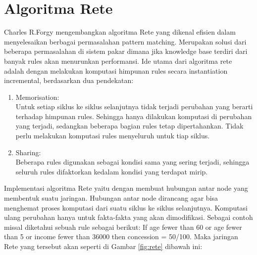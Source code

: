 \section{Algoritma Rete}
Charles R.Forgy \cite{charles1982} mengembangkan algoritma Rete yang dikenal efisien dalam menyelesaikan berbagai permasalahan pattern matching. Merupakan solusi dari beberapa permasalahan di sistem pakar dimana jika knowledge base terdiri dari banyak rules akan menurunkan performansi. Ide utama dari algoritma rete adalah dengan melakukan komputasi himpunan rules secara instantiation incremental, berdasarkan dua pendekatan:
\begin{enumerate}
	\item Memorisation:\\ Untuk setiap siklus ke siklus selanjutnya tidak terjadi perubahan yang berarti terhadap himpunan rules. Sehingga hanya dilakukan komputasi di perubahan yang terjadi, sedangkan beberapa bagian rules tetap dipertahankan. Tidak perlu melakukan komputasi rules menyeluruh untuk tiap siklus. 
	\item Sharing:\\  Beberapa rules digunakan sebagai kondisi sama yang sering terjadi, sehingga seluruh rules difaktorkan kedalam kondisi yang terdapat mirip.
\end{enumerate}	
Implementasi algoritma Rete yaitu dengan membuat hubungan antar node yang membentuk suatu jaringan. Hubungan antar node dirancang agar bisa menghemat proses komputasi dari suatu siklus ke siklus selanjutnya. Komputasi ulang perubahan hanya untuk fakta-fakta yang akan dimodifikasi. Sebagai contoh missal diketahui sebuah rule sebagai berikut: If age fewer than 60 or age fewer than 5 or income fewer than 36000 then concession = 50/100. 
Maka jaringan Rete yang tersebut akan seperti di Gambar \ref{fig:rete} dibawah ini:
